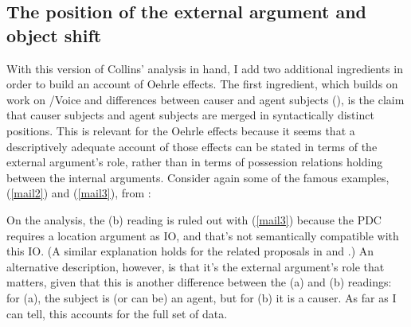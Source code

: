 \documentclass[output=paper,colorlinks,citecolor=brown]{langscibook}
\begin{document}
\subsection{The position of the external argument and object shift}
With this version of Collins' analysis in hand, I add two additional ingredients in order to build an account of Oehrle effects. The first ingredient, which builds on work on /Voice and differences between causer and agent subjects (\citealt{gt:Pesetsky:1995, gt:Folli:2005, gt:Folli:2006, gt:Folli:2007, gt:Schafer:2008, gt:Bjorkman:2018}), is the claim that causer subjects and agent subjects are merged in syntactically distinct positions. This is relevant for the Oehrle effects because it seems that a descriptively adequate account of those effects can be stated in terms of the external argument's role, rather than in terms of possession relations holding between the internal arguments. Consider again some of the famous  examples, (\ref{mail2}) and (\ref{mail3}), from \citet{gt:Oehrle:1976}: 



\noindent On the \citet{gt:Harley:2002a} analysis, the (b) reading is ruled out with (\ref{mail3}) because the PDC requires a location argument as IO, and that's not semantically compatible with this  IO. (A similar explanation holds for the related proposals in \cite{gt:Bruening:2010a} and \cite{gt:Harley:2015}.) An alternative description, however, is that it's the external argument's role that matters, given that this is another difference between the (a) and (b) readings: for (a), the subject is (or can be) an agent, but for (b) it is a causer. As far as I can tell, this accounts for the full set of data. 
\end{document}
